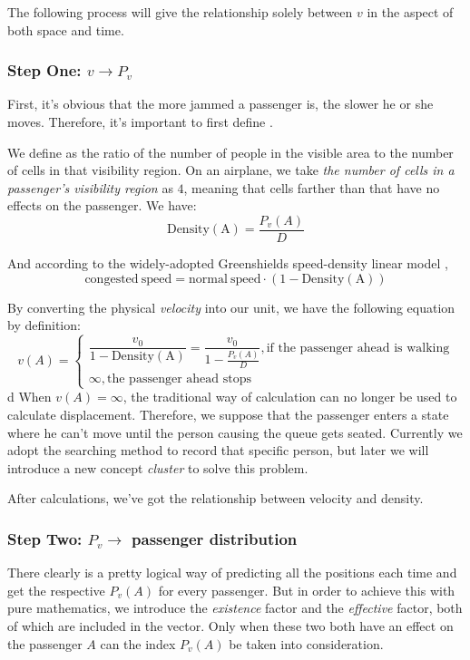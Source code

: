 \documentclass{article}
\theoremstyle{definition}
\theoremstyle{remark}
\numberwithin{equation}{section}
\begin{document}
	The following process will give the relationship solely between \(v\) in the aspect of both space and time.
	\subsubsection{Step One: \(v\to P_v\)}
	First, it's obvious that the more jammed a passenger is, the slower he or she moves. Therefore, it's important to first define .

	We define  as the ratio of the number of people in the visible area to the number of cells in that visibility region. On an airplane, we take \textit{the number of cells in a passenger's visibility region} as \(4\), meaning that cells farther than that have no effects on the passenger. We have:
	\[\mathrm{Density\left(A\right)} = \dfrac{P_v\left(A\right)}{D}\]

	And according to the widely-adopted Greenshields speed-density linear model \cite{greenshields}, \[\mathrm{congested\:speed} = \mathrm{normal\:speed}\cdot\left(1-\mathrm{Density\left(A\right)}\right)\]

	By converting the physical \textit{velocity} into our unit, we have the following equation by definition:
	\[v(A)=\begin{cases}\dfrac{v_0}{1-\mathrm{Density\left(A\right)}}=\dfrac{v_0}{1-\frac{P_v\left(A\right)}{D}}, \text{if the passenger ahead is walking}\\\infty, \text{the passenger ahead stops}\end{cases}\]
d
	When \(v\left(A\right)=\infty\), the traditional way of calculation can no longer be used to calculate displacement. Therefore, we suppose that the passenger enters a state where he can't move until the person causing the queue gets seated. Currently we adopt the searching method to record that specific person, but later we will introduce a new concept \textit{cluster} to solve this problem.

	After calculations, we've got the relationship between velocity and density.
	\subsubsection{Step Two: \(P_v\to \) passenger distribution}
	There clearly is a pretty logical way of predicting all the positions each time and get the respective \(P_v\left(A\right)\) for every passenger. But in order to achieve this with pure mathematics, we introduce the \textit{existence} factor and the \textit{effective} factor, both of which are included in the vector. Only when these two both have an effect on the passenger \(A\) can the index \(P_v\left(A\right)\) be taken into consideration.
\end{document}
